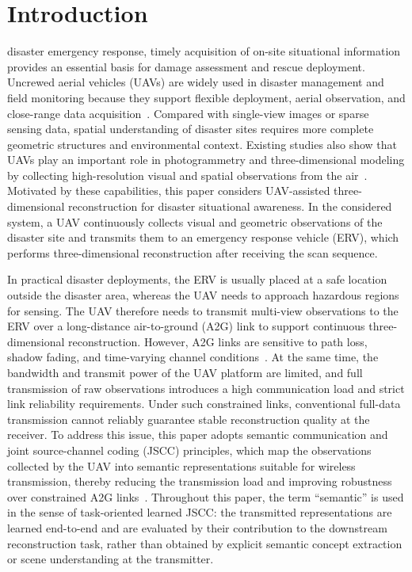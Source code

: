 \documentclass[journal]{IEEEtran}
\begin{document}
\section{Introduction}
\label{sec:introduction}
 disaster emergency response, timely acquisition of on-site situational information provides an essential basis for damage assessment and rescue deployment. Uncrewed aerial vehicles (UAVs) are widely used in disaster management and field monitoring because they support flexible deployment, aerial observation, and close-range data acquisition~\cite{A1,A2,A3,A4}. Compared with single-view images or sparse sensing data, spatial understanding of disaster sites requires more complete geometric structures and environmental context. Existing studies also show that UAVs play an important role in photogrammetry and three-dimensional modeling by collecting high-resolution visual and spatial observations from the air~\cite{A5,A6}. Motivated by these capabilities, this paper considers UAV-assisted three-dimensional reconstruction for disaster situational awareness. In the considered system, a UAV continuously collects visual and geometric observations of the disaster site and transmits them to an emergency response vehicle (ERV), which performs three-dimensional reconstruction after receiving the scan sequence.

In practical disaster deployments, the ERV is usually placed at a safe location outside the disaster area, whereas the UAV needs to approach hazardous regions for sensing. The UAV therefore needs to transmit multi-view observations to the ERV over a long-distance air-to-ground (A2G) link to support continuous three-dimensional reconstruction. However, A2G links are sensitive to path loss, shadow fading, and time-varying channel conditions~\cite{A7,A8}. At the same time, the bandwidth and transmit power of the UAV platform are limited, and full transmission of raw observations introduces a high communication load and strict link reliability requirements. Under such constrained links, conventional full-data transmission cannot reliably guarantee stable reconstruction quality at the receiver. To address this issue, this paper adopts semantic communication and joint source-channel coding (JSCC) principles, which map the observations collected by the UAV into semantic representations suitable for wireless transmission, thereby reducing the transmission load and improving robustness over constrained A2G links~\cite{A9,A10,A11}. Throughout this paper, the term ``semantic'' is used in the sense of task-oriented learned JSCC: the transmitted representations are learned end-to-end and are evaluated by their contribution to the downstream reconstruction task, rather than obtained by explicit semantic concept extraction or scene understanding at the transmitter.
\end{document}
